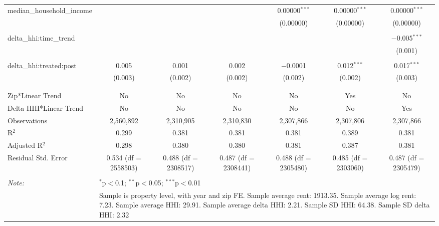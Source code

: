 \begin{table}[H]
{\begin{tabular}{@{\extracolsep{5pt}}lcccccc}
  median\_household\_income &  &  &  & 0.00000$^{***}$ & 0.00000$^{***}$ & 0.00000$^{***}$ \\  

   &  &  &  & (0.00000) & (0.00000) & (0.00000) \\  

   & & & & & & \\  

  delta\_hhi:time\_trend &  &  &  &  &  & $-$0.005$^{***}$ \\  

   &  &  &  &  &  & (0.001) \\  

   & & & & & & \\  

  delta\_hhi:treated:post & 0.005 & 0.001 & 0.002 & $-$0.0001 & 0.012$^{***}$ & 0.017$^{***}$ \\  

   & (0.003) & (0.002) & (0.002) & (0.002) & (0.002) & (0.003) \\  

   & & & & & & \\  

 \hline \\[-1.8ex]  

 Zip*Linear Trend & No & No & No & No & Yes & No \\  

 Delta HHI*Linear Trend & No & No & No & No & No & Yes \\  

 Observations & 2,560,892 & 2,310,905 & 2,310,830 & 2,307,866 & 2,307,806 & 2,307,866 \\  

 R$^{2}$ & 0.299 & 0.381 & 0.381 & 0.381 & 0.389 & 0.381 \\  

 Adjusted R$^{2}$ & 0.298 & 0.380 & 0.380 & 0.381 & 0.387 & 0.381 \\  

 Residual Std. Error & 0.534 (df = 2558503) & 0.488 (df = 2308517) & 0.487 (df = 2308441) & 0.488 (df = 2305480) & 0.485 (df = 2303060) & 0.487 (df = 2305479) \\  

 \hline  

 \hline \\[-1.8ex]  

 \textit{Note:}  & \multicolumn{6}{l}{$^{*}$p$<$0.1; $^{**}$p$<$0.05; $^{***}$p$<$0.01} \\  

  & \multicolumn{6}{l}{Sample is property level, with year and zip FE. Sample average rent: 1913.35. Sample average log rent: 7.23. Sample average HHI: 29.91. Sample average delta HHI: 2.21. Sample SD HHI: 64.38. Sample SD delta HHI: 2.32} \\  

 \end{tabular}}  

 \end{table}  

